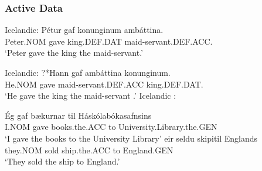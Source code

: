 \subsubsection{Active Data}
\begin{exe}
	 Icelandic:
		\gll P\'{e}tur gaf konunginum amb\'{a}ttina.\\
		Peter.NOM gave king.DEF.DAT maid-servant.DEF.ACC.\\
		\trans `Peter gave the king the maid-servant.'

	 Icelandic:
		\gll ?*Hann gaf amb\'attina konunginum.\\
		He.NOM gave maid-servant.DEF.ACC king.DEF.DAT. \\
		\trans `He gave the king the maid-servant \citep[ex 14b]{Dehe.2004}.'
	 Icelandic \citep{Thrainsson.2007}:
		\begin{xlist}
		\ex \gll \'{E}g gaf b\ae kurnar til H\'ask\'olab\'okasafnsins\\
		I.NOM gave books.the.ACC to University.Library.the.GEN\\
		\trans `I gave the books to the University Library'
		\ex \gll \th eir seldu skipi\dh til Englands\\
		they.NOM sold ship.the.ACC to England.GEN\\
		\trans `They sold the ship to England.'
		\end{xlist}

\end{exe}

